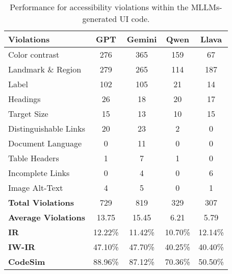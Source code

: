 \renewcommand{\arraystretch}{1.1}
\begin{table}
\tabcolsep=0.5cm
\centering
\small

\begin{tabular}{l|c|c|c|c} 
\hline
\rowcolor{lightgray} \textbf{Violations} & \textbf{GPT} & \textbf{Gemini} & \textbf{Qwen} & \textbf{Llava}  \\ 
\hline
Color contrast & 276 & 365 & 159 & 67 \\
\hline
Landmark \& Region & 279 & 265 & 114 & 187 \\
\hline
Label & 102 & 105 & 21 & 14 \\
\hline
Headings & 26 & 18 & 20 & 17 \\
\hline
Target Size & 15 & 13 & 10 & 15 \\
\hline
Distinguishable Links & 20 & 23 & 2 & 0 \\
\hline
Document Language & 0 & 11 & 0 & 0 \\
\hline
Table Headers & 1 & 7 & 1 & 0 \\
\hline
Incomplete Links & 0 & 4 & 0 & 6 \\
\hline
Image Alt-Text & 4 & 5 & 0 & 1 \\
\hline
\hline
\textbf{Total Violations} & 729 & 819 & 329 & 307 \\
\hline
\textbf{Average Violations} & 13.75 & 15.45 & 6.21 & 5.79 \\
\hline
\textbf{IR} & 12.22\% & 11.42\% & 10.70\% & 12.14\% \\
\hline
\textbf{IW-IR} & 47.10\% & 47.70\% & 40.25\% & 40.40\% \\
\hline
\textbf{CodeSim} & 88.96\% & 87.12\% & 70.36\% & 50.50\% \\
\hline
\end{tabular}
\caption{Performance for accessibility violations within the MLLMs-generated UI code.}
\label{tab:table-performance}
\end{table}